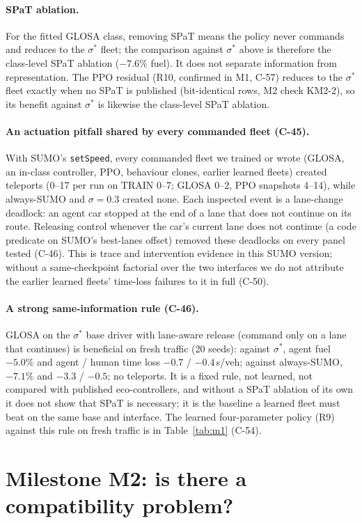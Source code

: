 \documentclass[11pt]{article}
\begin{document}
\paragraph{SPaT ablation.} For the fitted GLOSA class, removing SPaT means the policy never commands and reduces to the
$\sigma^*$ fleet; the comparison against $\sigma^*$ above is therefore the class-level SPaT ablation ($-7.6\%$ fuel). It does not separate
information from representation. The PPO residual (R10, confirmed in M1, C-57) reduces to the $\sigma^*$ fleet exactly when no SPaT is
published (bit-identical rows, M2 check KM2-2), so its benefit against $\sigma^*$ is likewise the class-level SPaT ablation.
\paragraph{An actuation pitfall shared by every commanded fleet (C-45).} With SUMO's \texttt{setSpeed}, every commanded fleet we
trained or wrote (GLOSA, an in-class controller, PPO, behaviour clones, earlier learned fleets) created teleports (0--17 per run on TRAIN 0--7;
GLOSA 0--2, PPO snapshots 4--14), while always-SUMO and $\sigma=0.3$ created none. Each inspected event is a lane-change deadlock: an agent car stopped at the end of a lane that does
not continue on its route. Releasing control whenever the car's current lane does not continue (a code predicate on SUMO's best-lanes
offset) removed these deadlocks on every panel tested (C-46). This is trace and intervention evidence in this SUMO version; without a
same-checkpoint factorial over the two interfaces we do not attribute the earlier learned fleets' time-loss failures to it in full (C-50).
\paragraph{A strong same-information rule (C-46).} GLOSA on the $\sigma^*$ base driver with lane-aware release (command only on a lane
that continues) is beneficial on fresh traffic (20 seeds): against $\sigma^*$, agent fuel $-5.0\%$ and agent / human time loss $-0.7$ /
$-0.4$\,s/veh; against always-SUMO, $-7.1\%$ and $-3.3$ / $-0.5$; no teleports. It is a fixed rule, not learned, not compared with
published eco-controllers, and without a SPaT ablation of its own it does not show that SPaT is necessary; it is the baseline a learned
fleet must beat on the same base and interface.
The learned four-parameter policy (R9) against this rule on fresh traffic is in Table~\ref{tab:m1} (C-54).

\section{Milestone M2: is there a compatibility problem?}
\end{document}
